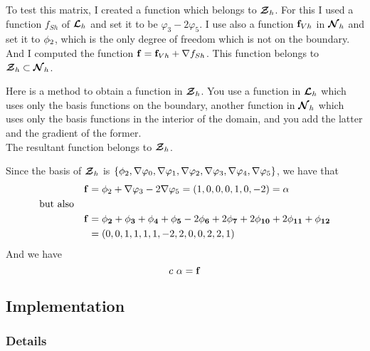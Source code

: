 To test this matrix, I created a function which belongs to ${\bm{\mathcal{Z}}}_h$. For this I used a function $f_{Sh}$ of ${\bm{\mathcal{L}}}_h$ and set it to be $\varphi_3 - 2\varphi_5$.
I use also a function ${\mathbf{f}}_{Vh}$ in ${\bm{\mathcal{N}}}_h$ and set it to ${\mathbf{\phi}}_2$, which is the only degree of freedom which is not on the boundary.\\
And I computed the function ${\mathbf{f}}={\mathbf{f}}_{Vh}+{\nabla} f_{Sh}$. This function belongs to ${\bm{\mathcal{Z}}}_h\subset{\bm{\mathcal{N}}}_h$.\\
\begin{rk}\label{createZh}
  Here is a method to obtain a function in ${\bm{\mathcal{Z}}}_h$. You use a function in ${\bm{\mathcal{L}}}_h$ which uses only the basis functions on the boundary, another function in ${\bm{\mathcal{N}}}_h$ which uses only the basis functions in the interior of the domain, and you add the latter and the gradient of the former.\\
  The resultant function belongs to ${\bm{\mathcal{Z}}}_h$.
\end{rk}
Since the basis of ${\bm{\mathcal{Z}}}_h$ is $\{{\mathbf{\phi}}_2,{\nabla}\varphi_0,{\nabla}\varphi_1,{\nabla}\varphi_2,{\nabla}\varphi_3,{\nabla}\varphi_4,{\nabla}\varphi_5\}$, we have that 
\begin{align*}
  &&{\mathbf{f}} &= {\mathbf{\phi}}_2 + {\nabla}\varphi_3-2{\nabla}\varphi_5 = (1,0,0,0,1,0,-2) = \alpha\\
  \mbox{but also} &&&\\
  && {\mathbf{f}} &= {\mathbf{\phi_2}} + {\mathbf{\phi_3}} + {\mathbf{\phi_4}} + {\mathbf{\phi_5}} -2 {\mathbf{\phi_6}} +2 {\mathbf{\phi_7}} +2 {\mathbf{\phi_{10}}} +2 {\mathbf{\phi_{11}}} + {\mathbf{\phi_{12}}}\\
  &&&= (0,0,1,1,1,1,-2,2,0,0,2,2,1)
\end{align*}
And we have 
\[
c\ \alpha = \mbf{f}
\]

\subsection{Implementation}
\subsubsection{Details}

